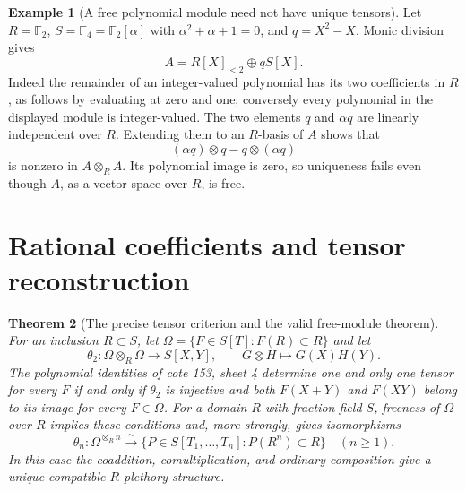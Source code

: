 \documentclass[11pt,a4paper]{article}
\newtheorem{theorem}{Theorem}[section]
\theoremstyle{definition}
\newtheorem{example}[theorem]{Example}
\begin{document}
\begin{example}[A free polynomial module need not have unique tensors]
Let $R=\mathbb F_2$, $S=\mathbb F_4=\mathbb F_2[\alpha]$
with $\alpha^2+\alpha+1=0$, and $q=X^2-X$.  Monic division gives
\[
 A=R[X]_{<2}\oplus qS[X].
\]
Indeed the remainder of an integer-valued polynomial has its two
coefficients in $R$, as follows by evaluating at zero and one; conversely
every polynomial in the displayed module is integer-valued.  The two
elements $q$ and $\alpha q$ are linearly independent over $R$.  Extending
them to an $R$-basis of $A$ shows that
\[
 (\alpha q)\otimes q-q\otimes(\alpha q)
\]
is nonzero in $A\otimes_R A$.  Its polynomial image is zero, so uniqueness
fails even though $A$, as a vector space over $R$, is free.
\end{example}


\section{Rational coefficients and tensor reconstruction}
\begin{theorem}[The precise tensor criterion and the valid free-module theorem]\label{result-21}
For an inclusion $R\subset S$, let
$\Omega=\{F\in S[T]:F(R)\subset R\}$ and let
\[
 \theta_2:\Omega\otimes_R\Omega\longrightarrow S[X,Y],
 \qquad G\otimes H\longmapsto G(X)H(Y).
\]
The polynomial identities of cote 153, sheet 4 determine one and only one
tensor for every $F$ if and only if $\theta_2$ is injective and both
$F(X+Y)$ and $F(XY)$ belong to its image for every $F\in\Omega$.
For a domain $R$ with fraction field $S$, freeness of $\Omega$ over
$R$ implies these conditions and, more strongly, gives isomorphisms
\[
 \theta_n:\Omega^{\otimes_R n}\xrightarrow{\sim}
 \{P\in S[T_1,\ldots,T_n]:P(R^n)\subset R\}
 \quad(n\ge1).
\]
In this case the coaddition, comultiplication, and ordinary
composition give a unique compatible $R$-plethory structure.
\end{theorem}
\end{document}
